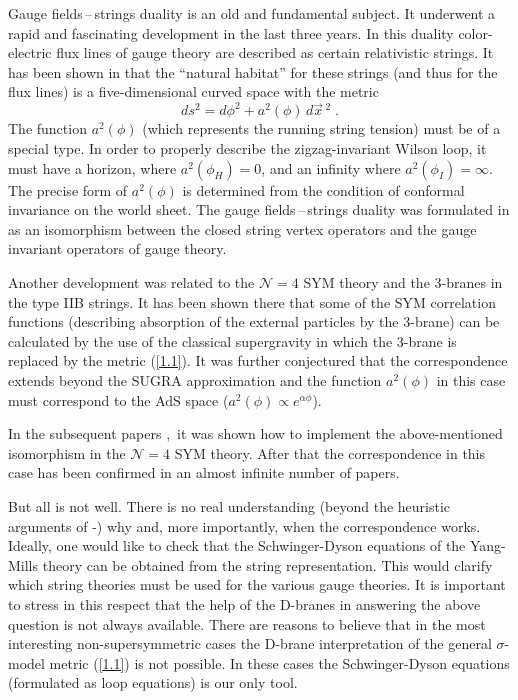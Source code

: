 \documentclass[a4paper,12pt]{article}
\numberwithin{equation}{section}
\begin{document}
Gauge fields\,--\,strings duality is an old and fundamental subject. It underwent
a rapid and fascinating development in the last three years. In this duality
color-electric flux lines of gauge theory are described as certain relativistic
strings. It has been shown in \cite{1} that the ``natural habitat'' for these
strings (and thus for the flux lines) is a five-dimensional curved space with
the metric
\begin{equation}
\label{1.1}
ds^{2}=d\phi ^{2}+a^{2}(\phi )\, d\vec{x}\, ^{2}\; .
\end{equation}
The function \( a^{2}(\phi ) \) (which represents the running string tension)
must be of a special type. In order to properly describe the zigzag-invariant
Wilson loop, it must have a horizon, where \( a^{2}(\phi _{H})=0 \), and an
infinity where \( a^{2}(\phi _{I})=\infty  \). The precise form of \( a^{2}(\phi ) \)
is determined from the condition of conformal invariance on the world sheet.
The gauge fields\,--\,strings duality was formulated in \cite{1} as an isomorphism
between the closed string vertex operators and the gauge invariant operators
of gauge theory.

Another development \cite{2} was related to the \( \mathcal{N}=4 \) SYM theory
and the 3-branes in the type IIB strings. It has been shown there that some
of the SYM correlation functions (describing absorption of the external particles
by the 3-brane) can be calculated by the use of the classical supergravity in
which the 3-brane is replaced by the metric (\ref{1.1}). It was further conjectured
\cite{3} that the correspondence extends beyond the SUGRA approximation and
the function \( a^{2}(\phi ) \) in this case must correspond to the AdS space
(\( a^{2}(\phi )\varpropto e^{\alpha \phi } \)).

In the subsequent papers \cite{4},\( \,  \)\cite{5} it was shown how to implement
the above-mentioned isomorphism in the \( \mathcal{N}=4 \) SYM theory. After
that the correspondence in this case has been confirmed in an almost infinite
number of papers.

But all is not well. There is no real understanding (beyond the heuristic arguments
of \cite{1}-\cite{5}) why and, more importantly, when the correspondence works.
Ideally, one would like to check that the Schwinger-Dyson equations of the Yang-Mills
theory can be obtained from the string representation. This would clarify which
string theories must be used for the various gauge theories. It is important
to stress in this respect that the help of the D-branes in answering the above
question is not always available. There are reasons to believe that in the most
interesting non-supersymmetric cases the D-brane interpretation of the general
\( \sigma  \)-model metric (\ref{1.1}) is not possible. In these cases the
Schwinger-Dyson equations (formulated as loop equations) is our only tool.
\end{document}
